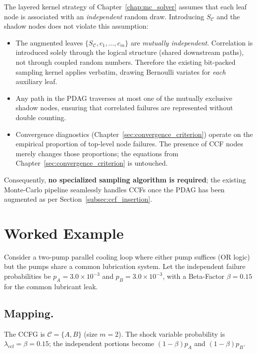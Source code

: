 The layered kernel strategy of Chapter~\ref{chap:mc_solver} assumes that each
leaf node is associated with an \emph{independent} random draw.  Introducing
$S_{\mathcal{C}}$ and the shadow nodes does not violate this assumption:
\begin{itemize}
  \item The augmented leaves \(\{S_{\mathcal{C}},c_1,\dots,c_m\}\) are   \emph{mutually independent}.  Correlation is introduced solely through the
        logical structure (shared downstream paths), not through coupled random
        numbers.  Therefore the existing bit-packed sampling kernel applies
        verbatim, drawing Bernoulli variates for \emph{each} auxiliary leaf.
  \item Any path in the PDAG traverses at most one of the mutually exclusive
        shadow nodes, ensuring that correlated failures are represented without
        double counting.
  \item Convergence diagnostics (Chapter~\ref{sec:convergence_criterion})
        operate on the empirical proportion of top-level node failures.  The
        presence of CCF nodes merely changes those proportions; the equations from
        Chapter~\ref{sec:convergence_criterion} is untouched.
\end{itemize}
Consequently, \textbf{no specialized sampling algorithm is required}; the
existing Monte-Carlo pipeline seamlessly handles CCFs once the PDAG has been
augmented as per Section~\ref{subsec:ccf_insertion}.

\section{Worked Example}
\label{sec:ccf_example}

Consider a two-pump parallel cooling loop where either pump suffices
(OR logic) but the pumps share a common lubrication system.  Let the independent
failure probabilities be \(p_A=3.0\times10^{-3}\) and \(p_B=3.0\times10^{-3}\),
with a Beta-Factor \(\beta=0.15\) for the common lubricant leak.

\subsection*{Mapping.}  The CCFG is \(\mathcal{C}=\{A,B\}\) (size $m=2$).  The
shock variable probability is $\lambda_{\text{ccf}}=\beta=0.15$; the
independent portions become $(1-\beta)p_A$ and $(1-\beta)p_B$.

